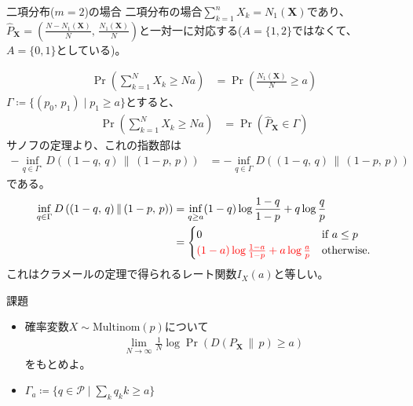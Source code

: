 \documentclass[lualatex,handout]{beamer}
\newcommand{\mycolor}[2]{%
  \begingroup
  \colorlet{currentcolor}{.}%
  \color{#1}#2%
  \color{currentcolor}%
  \endgroup
}
\newcommand{\emm}[1]{\mycolor{red}{#1}}
\newcommand\KL[2]{D\left(#1\,\|\,#2\right)}
\theoremstyle{definition}
\begin{document}
\begin{frame}{二項分布($m=2$)の場合}
\footnotesize
二項分布の場合$\sum_{k=1}^n X_k=N_1(\symbf{X})$であり、$\widehat{P}_{\symbf{X}}=\left(\frac{N-N_1(\symbf{X})}N,\,\frac{N_1(\symbf{X})}N\right)$と一対一に対応する($A=\{1,2\}$ではなくて、$A=\{0,1\}$としている)。

\begin{align*}
\Pr\left(\sum_{k=1}^N X_k \ge Na\right)
&=
\Pr\left(\frac{N_1(\symbf{X})}{N} \ge a\right)
\end{align*}
$\Gamma\coloneq \{(p_0,\,p_1)\mid p_1\ge a\}$とすると、
\begin{align*}
\Pr\left(\sum_{k=1}^N X_k \ge Na\right)
&=
\Pr\left(\widehat{P}_{\symbf{X}} \in\Gamma\right)
\end{align*}
サノフの定理より、これの指数部は
\begin{align*}
-\inf_{q\in\Gamma^\circ} \KL{(1-q,\,q)}{(1-p,\,p)}
&=-\inf_{q\in\Gamma} \KL{(1-q,\,q)}{(1-p,\,p)}
\end{align*}
である。
\begin{align*}
\inf_{q\in\Gamma} \KL{(1-q,\,q)}{(1-p,\,p)}&= \inf_{q\ge a} (1-q)\log\frac{1-q}{1-p} + q\log\frac{q}{p}\\
&= 
\begin{cases}
0&\text{if } a\le p\\
\emm{(1-a)\log\frac{1-a}{1-p} + a\log\frac{a}{p}}& \text{otherwise.}
\end{cases}
\end{align*}
これはクラメールの定理で得られるレート関数$I_X(a)$と等しい。
\end{frame}

\begin{frame}{課題}
\begin{itemize}
\item 確率変数$X\sim\mathrm{Multinom}(p)$について
\begin{align*}
\lim_{N\to\infty} \frac1N\log\Pr\left(\KL{P_{\symbf{X}}}{p}\ge a\right)
\end{align*}
をもとめよ。
\item $\Gamma_a\coloneq\{q\in\mathcal{P}\mid \sum_k q_k k \ge a\}$
\end{itemize}
\end{frame}
\end{document}
